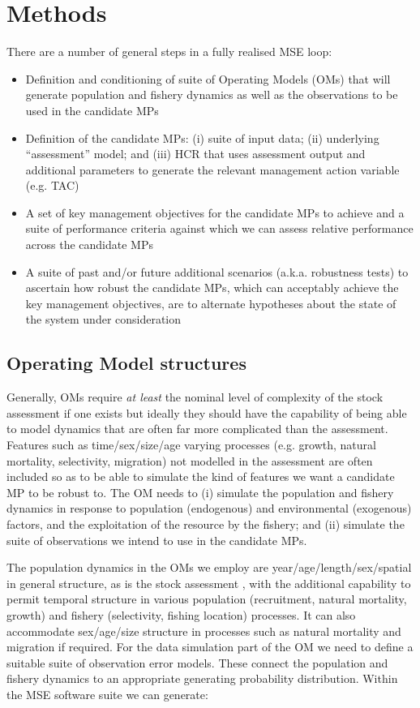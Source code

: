 \documentclass[12pt,a4paper,twoside,times,sky,standard]{csiroreport2017}
\begin{document}
\section{Methods}

There are a number of general steps in a fully realised MSE loop:

\begin{itemize}
    \item Definition and conditioning of suite of Operating Models (OMs) that will generate population and fishery dynamics as well as the observations to be used in the candidate MPs
    \item Definition of the candidate MPs: (i) suite of input data; (ii) underlying ``assessment'' model; and (iii) HCR that uses assessment output and additional parameters to generate the relevant management action variable (e.g. TAC)
    \item A set of key management objectives for the candidate MPs to achieve and a suite of performance criteria against which we can assess relative performance across the candidate MPs
    \item A suite of past and/or future additional scenarios (a.k.a. robustness tests) to ascertain how robust the candidate MPs, which can acceptably achieve the key management objectives, are to alternate hypotheses about the state of the system under consideration  
\end{itemize}

\subsection{Operating Model structures}

Generally, OMs require \emph{at least} the nominal level of complexity of the stock assessment if one exists \cite{mse} but ideally they should have the capability of being able to model dynamics that are often far more complicated than the assessment. Features such as time/sex/size/age varying processes (e.g. growth, natural mortality, selectivity, migration) not modelled in the assessment are often included so as to be able to simulate the kind of features we want a candidate MP to be robust to. The OM needs to (i) simulate the population and fishery dynamics in response to population (endogenous) and environmental (exogenous) factors, and the exploitation of the resource by the fishery; and (ii) simulate the suite of observations we intend to use in the candidate MPs.

The population dynamics in the OMs we employ are year/age/length/sex/spatial in general structure, as is the stock assessment \cite{misa}, with the additional capability to permit temporal structure in various population (recruitment, natural mortality, growth) and fishery (selectivity, fishing location) processes. It can also accommodate sex/age/size structure in processes such as natural mortality and migration if required. For the data simulation part of the OM we need to define a suitable suite of observation error models. These connect the population and fishery dynamics to an appropriate generating probability distribution. Within the MSE software suite we can generate:
\end{document}
